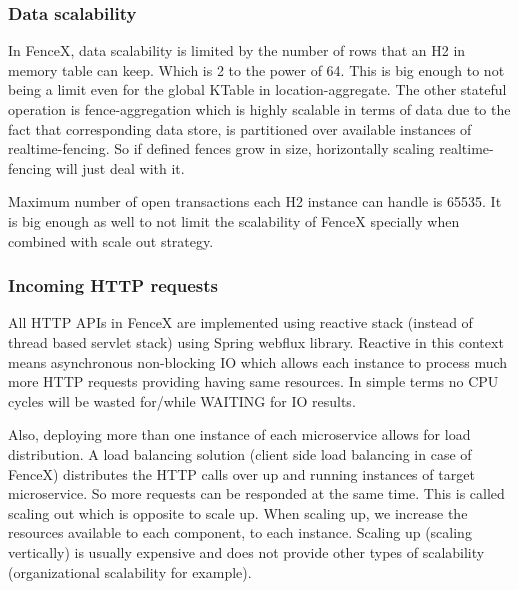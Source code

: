 \documentclass[a4]{report}
\begin{document}
    \subsubsection{Data scalability \cite{h2}}
    In FenceX, data scalability is limited by the number of rows that an H2 in memory table can keep.
    Which is 2 to the power of 64.
    This is big enough to not being a limit even for the global KTable in location-aggregate.
    The other stateful operation is fence-aggregation which is highly scalable in terms of data due to the
    fact that corresponding data store, is partitioned over available instances of realtime-fencing.
    So if defined fences grow in size, horizontally scaling realtime-fencing will just deal with it.

    Maximum number of open transactions each H2 instance can handle is 65535.
    It is big enough as well to not limit the scalability of FenceX specially when combined with scale out strategy.

    \subsubsection{Incoming HTTP requests}
    All HTTP APIs in FenceX are implemented using reactive stack (instead of thread based servlet stack) using Spring
    webflux library.
    Reactive in this context means asynchronous non-blocking IO which allows each instance to process much more HTTP
    requests providing having same resources.
    In simple terms no CPU cycles will be wasted for/while WAITING for IO results.

    Also, deploying more than one instance of each microservice allows for load distribution.
    A load balancing solution (client side load balancing in case of FenceX) distributes the HTTP calls over up and
    running instances of target microservice.
    So more requests can be responded at the same time.
    This is called scaling out which is opposite to scale up.
    When scaling up, we increase the resources available to each component, to each instance.
    Scaling up (scaling vertically) is usually expensive and does not provide other types of scalability
    (organizational scalability for example).
\end{document}
